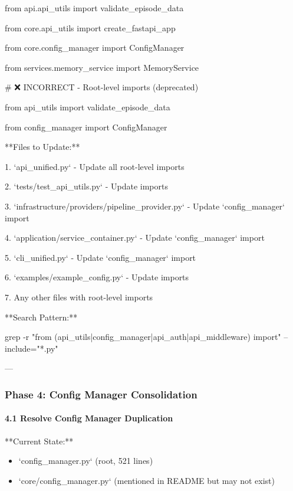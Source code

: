\documentclass[11pt,a4paper]{article}
\begin{document}
from api.api\_utils import validate\_episode\_data

from core.api\_utils import create\_fastapi\_app

from core.config\_manager import ConfigManager

from services.memory\_service import MemoryService

\# ❌ INCORRECT - Root-level imports (deprecated)

from api\_utils import validate\_episode\_data

from config\_manager import ConfigManager

**Files to Update:**

1. `api\_unified.py` - Update all root-level imports

2. `tests/test\_api\_utils.py` - Update imports

3. `infrastructure/providers/pipeline\_provider.py` - Update `config\_manager` import

4. `application/service\_container.py` - Update `config\_manager` import

5. `cli\_unified.py` - Update `config\_manager` import

6. `examples/example\_config.py` - Update imports

7. Any other files with root-level imports

**Search Pattern:**

grep -r "from (api\_utils|config\_manager|api\_auth|api\_middleware) import" --include="*.py"

---

\subsubsection{Phase 4: Config Manager Consolidation}

\paragraph{4.1 Resolve Config Manager Duplication}

**Current State:**

\begin{itemize}
\item `config_manager.py` (root, 521 lines)
\end{itemize}

\begin{itemize}
\item `core/config_manager.py` (mentioned in README but may not exist)
\end{itemize}
\end{document}
